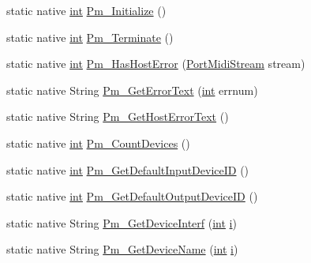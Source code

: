 \begin{DoxyCompactItemize}
\item 
static native \hyperlink{xmltok_8h_a5a0d4a5641ce434f1d23533f2b2e6653}{int} \hyperlink{classjportmidi_1_1_j_port_midi_api_a5534ec2b1e7850814c0d4e4ad6f56112}{Pm\+\_\+\+Initialize} ()
\item 
static native \hyperlink{xmltok_8h_a5a0d4a5641ce434f1d23533f2b2e6653}{int} \hyperlink{classjportmidi_1_1_j_port_midi_api_a1f58fdd415325844386afb9b1d3a6abc}{Pm\+\_\+\+Terminate} ()
\item 
static native \hyperlink{xmltok_8h_a5a0d4a5641ce434f1d23533f2b2e6653}{int} \hyperlink{classjportmidi_1_1_j_port_midi_api_a965ce7db077460a739c42dd2c208f8ff}{Pm\+\_\+\+Has\+Host\+Error} (\hyperlink{portmidi_8h_af4949219ee1bb0afc857cb242d123914}{Port\+Midi\+Stream} stream)
\item 
static native String \hyperlink{classjportmidi_1_1_j_port_midi_api_ac93f4a260040e64df1238ca76c46bc79}{Pm\+\_\+\+Get\+Error\+Text} (\hyperlink{xmltok_8h_a5a0d4a5641ce434f1d23533f2b2e6653}{int} errnum)
\item 
static native String \hyperlink{classjportmidi_1_1_j_port_midi_api_a0bdd2538e579932bbd63f260b68b964a}{Pm\+\_\+\+Get\+Host\+Error\+Text} ()
\item 
static native \hyperlink{xmltok_8h_a5a0d4a5641ce434f1d23533f2b2e6653}{int} \hyperlink{classjportmidi_1_1_j_port_midi_api_a5ffe02cfd002fa23c4ebba0d44ad01d5}{Pm\+\_\+\+Count\+Devices} ()
\item 
static native \hyperlink{xmltok_8h_a5a0d4a5641ce434f1d23533f2b2e6653}{int} \hyperlink{classjportmidi_1_1_j_port_midi_api_aa31975d4e14da4e02f72de478bd69b22}{Pm\+\_\+\+Get\+Default\+Input\+Device\+ID} ()
\item 
static native \hyperlink{xmltok_8h_a5a0d4a5641ce434f1d23533f2b2e6653}{int} \hyperlink{classjportmidi_1_1_j_port_midi_api_a4d291d8f9dc776a8acb3ed68451bcb62}{Pm\+\_\+\+Get\+Default\+Output\+Device\+ID} ()
\item 
static native String \hyperlink{classjportmidi_1_1_j_port_midi_api_a8b2661b9b3ae7c185e881dae2da86638}{Pm\+\_\+\+Get\+Device\+Interf} (\hyperlink{xmltok_8h_a5a0d4a5641ce434f1d23533f2b2e6653}{int} \hyperlink{checksum_8c_ab80e330a3bc9e38c1297fe17381e92b4}{i})
\item 
static native String \hyperlink{classjportmidi_1_1_j_port_midi_api_a89aeaf88451a4ccbd05007aea99ba354}{Pm\+\_\+\+Get\+Device\+Name} (\hyperlink{xmltok_8h_a5a0d4a5641ce434f1d23533f2b2e6653}{int} \hyperlink{checksum_8c_ab80e330a3bc9e38c1297fe17381e92b4}{i})

\end{DoxyCompactItemize}
